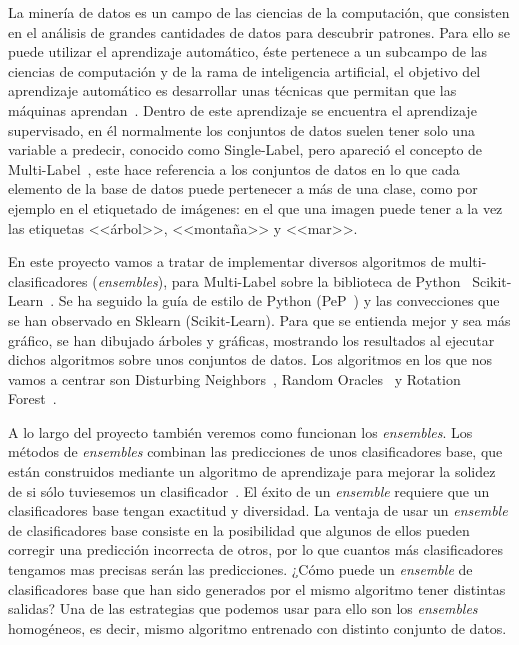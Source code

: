 
La minería de datos es un campo de 	las ciencias de la computación, que consisten en el análisis de grandes cantidades de datos para descubrir patrones.
Para ello se puede utilizar el aprendizaje automático, éste pertenece a un subcampo de las ciencias de computación y de la rama de inteligencia artificial, el objetivo del aprendizaje automático es desarrollar unas técnicas que permitan que las máquinas aprendan~\cite{wiki:datamining}.
Dentro de este aprendizaje se encuentra el aprendizaje supervisado, en él normalmente los conjuntos de datos suelen tener solo una variable a predecir, conocido como Single-Label, pero apareció el concepto de Multi-Label~\cite{multilabel2}, este hace referencia a los conjuntos de datos en lo que cada elemento de la base de datos puede pertenecer a más de una clase, como por ejemplo en el etiquetado de imágenes: en el que una imagen puede tener a la vez las etiquetas <<árbol>>, <<montaña>> y <<mar>>.

En este proyecto vamos a tratar de implementar diversos algoritmos de multi-clasificadores (\textit{ensembles}), para Multi-Label sobre la biblioteca de Python~\cite{python} Scikit-Learn~\cite{scikitlearn}. Se ha seguido la guía de estilo de Python (PeP~\cite{pep}) y las convecciones que se han observado en Sklearn (Scikit-Learn). Para que se entienda mejor y sea más gráfico, se han dibujado árboles y gráficas, mostrando los resultados al ejecutar dichos algoritmos sobre unos conjuntos de datos. Los algoritmos en los que nos vamos a centrar son Disturbing Neighbors~\cite{disturbingneighbors}, Random Oracles~\cite{randomoracles} y Rotation Forest~\cite{rotationforest}.

A lo largo del proyecto también veremos como funcionan los \textit{ensembles}.
Los métodos de \textit{ensembles} combinan las predicciones de unos clasificadores base, que están construidos mediante un algoritmo de aprendizaje para mejorar la solidez de si sólo tuviesemos un clasificador~\cite{ensemble}.
El éxito de un \textit{ensemble} requiere que un clasificadores base tengan exactitud y diversidad.
La ventaja de usar un \textit{ensemble} de clasificadores base consiste en la posibilidad que algunos de ellos pueden corregir una predicción incorrecta de otros, por lo que cuantos más clasificadores tengamos mas precisas serán las predicciones. 
¿Cómo puede un \textit{ensemble} de clasificadores base que han sido generados por el mismo algoritmo tener distintas salidas? Una de las estrategias que podemos usar para ello son los \textit{ensembles} homogéneos, es decir, mismo algoritmo entrenado con distinto conjunto de datos.
